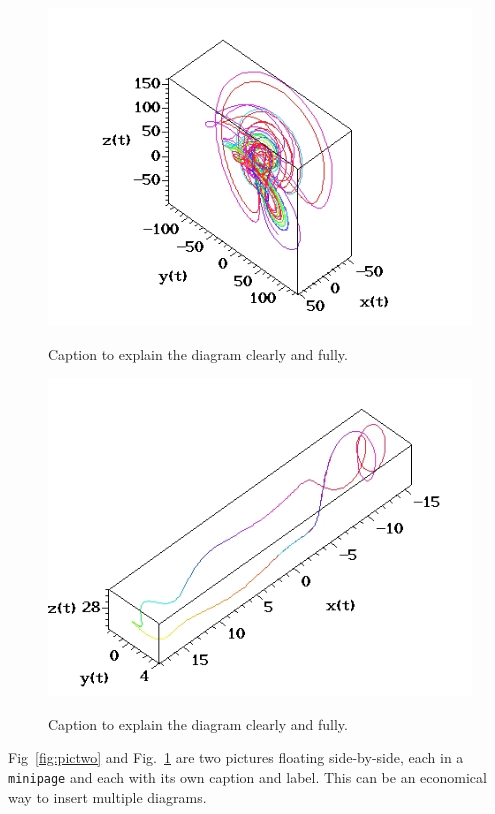 \begin{figure}[ht]\centering
\begin{minipage}[c]{.45\textwidth}\centering
  \includegraphics[width=.95\textwidth]{pic4.jpg}
  \caption{Caption to explain the diagram
clearly and fully.}\label{fig:pictwo}
\end{minipage}\hfill
\begin{minipage}[c]{.45\textwidth}\centering
  \includegraphics[width=.95\textwidth]{pic5.jpg}\\
  \caption{Caption to explain the diagram
clearly and fully.}\label{fig:picthree}
\end{minipage}
\end{figure}
Fig~\ref{fig:pictwo} and Fig.~\ref{fig:picthree} are two pictures
floating side-by-side, each in a \texttt{minipage} and each with its
own caption and label. This can be an economical way to insert multiple
diagrams.
%
